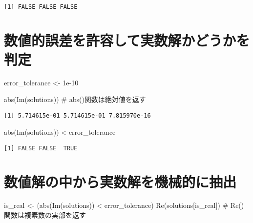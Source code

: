 \documentclass[
  letterpaper,
  DIV=11,
  numbers=noendperiod]{scrreprt}
\newenvironment{Shaded}{\begin{snugshade}}{\end{snugshade}}
\newcommand{\CommentTok}[1]{\textcolor[rgb]{0.37,0.37,0.37}{#1}}
\newcommand{\FloatTok}[1]{\textcolor[rgb]{0.68,0.00,0.00}{#1}}
\newcommand{\FunctionTok}[1]{\textcolor[rgb]{0.28,0.35,0.67}{#1}}
\newcommand{\NormalTok}[1]{\textcolor[rgb]{0.00,0.23,0.31}{#1}}
\newcommand{\OtherTok}[1]{\textcolor[rgb]{0.00,0.23,0.31}{#1}}
\newcommand{\SpecialCharTok}[1]{\textcolor[rgb]{0.37,0.37,0.37}{#1}}
\begin{document}
\begin{verbatim}
[1] FALSE FALSE FALSE
\end{verbatim}

\section{数値的誤差を許容して実数解かどうかを判定}\label{ux6570ux5024ux7684ux8aa4ux5deeux3092ux8a31ux5bb9ux3057ux3066ux5b9fux6570ux89e3ux304bux3069ux3046ux304bux3092ux5224ux5b9a}

\begin{Shaded}
\begin{Highlighting}[]
\NormalTok{error\_tolerance }\OtherTok{\textless{}{-}} \FloatTok{1e{-}10}

\FunctionTok{abs}\NormalTok{(}\FunctionTok{Im}\NormalTok{(solutions)) }\CommentTok{\# abs()関数は絶対値を返す}
\end{Highlighting}
\end{Shaded}

\begin{verbatim}
[1] 5.714615e-01 5.714615e-01 7.815970e-16
\end{verbatim}

\begin{Shaded}
\begin{Highlighting}[]
\FunctionTok{abs}\NormalTok{(}\FunctionTok{Im}\NormalTok{(solutions)) }\SpecialCharTok{\textless{}}\NormalTok{ error\_tolerance}
\end{Highlighting}
\end{Shaded}

\begin{verbatim}
[1] FALSE FALSE  TRUE
\end{verbatim}

\section{数値解の中から実数解を機械的に抽出}\label{ux6570ux5024ux89e3ux306eux4e2dux304bux3089ux5b9fux6570ux89e3ux3092ux6a5fux68b0ux7684ux306bux62bdux51fa}

\begin{Shaded}
\begin{Highlighting}[]
\NormalTok{is\_real }\OtherTok{\textless{}{-}}\NormalTok{ (}\FunctionTok{abs}\NormalTok{(}\FunctionTok{Im}\NormalTok{(solutions)) }\SpecialCharTok{\textless{}}\NormalTok{ error\_tolerance)}
\FunctionTok{Re}\NormalTok{(solutions[is\_real]) }\CommentTok{\# Re()関数は複素数の実部を返す}
\end{Highlighting}
\end{Shaded}
\end{document}
